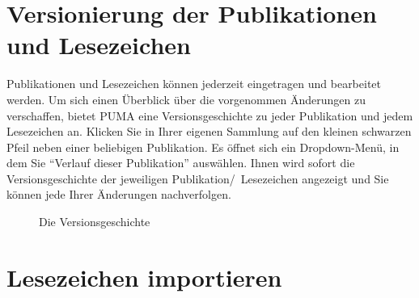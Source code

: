 \section{Versionierung der Publikationen und Lesezeichen}
\label{sec:versionierung}
Publikationen und Lesezeichen können jederzeit eingetragen und bearbeitet werden. Um sich einen Überblick über die vorgenommen Änderungen zu verschaffen, bietet PUMA eine Versionsgeschichte zu jeder Publikation und jedem Lesezeichen an. Klicken Sie in Ihrer eigenen Sammlung auf den kleinen schwarzen Pfeil neben einer beliebigen Publikation. Es öffnet sich ein Dropdown-Menü, in dem Sie \enquote{Verlauf dieser Publikation} auswählen. Ihnen wird sofort die Versionsgeschichte der jeweiligen Publikation/~Lesezeichen angezeigt und Sie können jede Ihrer Änderungen nachverfolgen. 
\begin{figure}[h!]
 \centering
 \caption{Die Versionsgeschichte}
 \label{fig:versionsgeschichte}
\end{figure} 
\section{Lesezeichen importieren}
\label{sec:lesezeichenImportieren}
